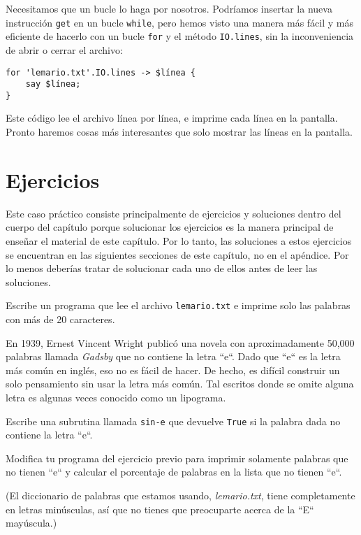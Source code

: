 Necesitamos que un bucle lo haga por nosotros. Podríamos insertar
la nueva instrucción {\tt get} en un bucle {\tt while}, pero
hemos visto una manera más fácil y más eficiente de hacerlo con
un bucle {\tt for} y el método {\tt IO.lines}, sin la inconveniencia
de abrir o cerrar el archivo:

\begin{verbatim}
for 'lemario.txt'.IO.lines -> $línea {
    say $línea;
}
\end{verbatim}
%
Este código lee el archivo línea por línea, e imprime cada línea
en la pantalla. Pronto haremos cosas más interesantes que solo
mostrar las líneas en la pantalla.

\section{Ejercicios}

Este caso práctico consiste principalmente de ejercicios y soluciones
dentro del cuerpo del capítulo porque solucionar los ejercicios es la
manera principal de enseñar el material de este capítulo. Por lo tanto, 
las soluciones a estos ejercicios se encuentran en las siguientes 
secciones de este capítulo, no en el apéndice. Por lo menos 
deberías tratar de solucionar cada uno de ellos antes de leer las
soluciones.

\begin{exercise}
Escribe un programa que lee el archivo {\tt lemario.txt} e imprime
solo las palabras con más de 20 caracteres.

\end{exercise}

\begin{exercise}

En 1939, Ernest Vincent Wright publicó una novela con aproximadamente
50,000 palabras llamada {\em Gadsby} que no contiene la letra ``e``. 
Dado que ``e`` es la letra más común en inglés, eso no es fácil
de hacer. De hecho, es difícil construir un solo pensamiento sin
usar la letra más común. Tal escritos donde se omite alguna letra
es algunas veces conocido como un lipograma.

Escribe una subrutina llamada \verb|sin-e| que devuelve {\tt True}
si la palabra dada no contiene la letra ``e``.
\label{no_e}

Modifica tu programa del ejercicio previo para imprimir solamente
palabras que no tienen ``e`` y calcular el porcentaje de palabras
en la lista que no tienen ``e``.

(El diccionario de palabras que estamos usando, \emph{lemario.txt}, 
tiene completamente en letras minúsculas, así que no tienes que preocuparte
acerca de la ``E`` mayúscula.)


\end{exercise}


